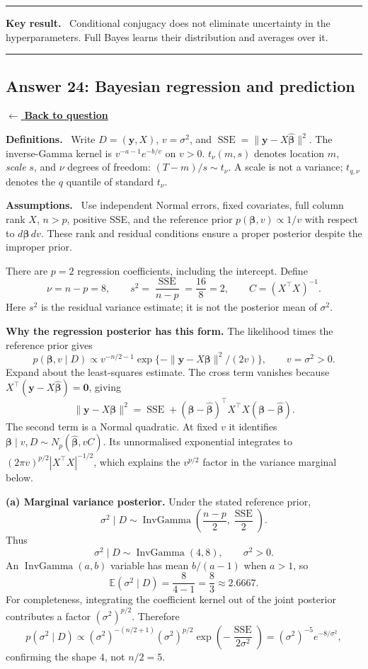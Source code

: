 \documentclass[11pt,a4paper]{article}
\newcommand{\given}{\mathrel{|}}
\DeclareMathOperator{\InvGamma}{InvGamma}
\newcommand{\E}{\mathbb{E}}
\newcommand{\answernav}[1]{%
  \label{answer:#1}%
  \noindent\hyperref[question:#1]{$\leftarrow$ \textbf{Back to question}}%
  \par\smallskip}
\newcommand{\studyheading}[1]{%
  \par\medskip\noindent\textcolor{statblue}{\textbf{#1.}}\ }
\newenvironment{keyresult}
  {\begin{center}\begin{minipage}{0.92\linewidth}\color{statblue}%
   \hrule\vspace{6pt}\textbf{Key result.}\ }
  {\vspace{6pt}\hrule\end{minipage}\end{center}}
\begin{document}
\begin{keyresult}
Conditional conjugacy does not eliminate uncertainty in the hyperparameters.
Full Bayes learns their distribution and averages over it.
\end{keyresult}

\clearpage

\subsection{Answer 24: Bayesian regression and prediction}
\answernav{24}

\studyheading{Definitions}
Write $D=(\mathbf y,X)$, $v=\sigma^2$, and
$\operatorname{SSE}=\|\mathbf y-X\widehat{\boldsymbol\beta}\|^2$.
The inverse-Gamma kernel is $v^{-a-1}e^{-b/v}$ on $v>0$.
$t_\nu(m,s)$ denotes location $m$, \emph{scale} $s$, and $\nu$ degrees of freedom: $(T-m)/s\sim t_\nu$.
A scale is not a variance; $t_{q,\nu}$ denotes the $q$ quantile of standard $t_\nu$.

\studyheading{Assumptions}
Use independent Normal errors, fixed covariates, full column rank $X$, $n>p$, positive SSE, and the reference prior
$p(\boldsymbol\beta,v)\propto1/v$ with respect to $d\boldsymbol\beta\,dv$.
These rank and residual conditions ensure a proper posterior despite the improper prior.

There are $p=2$ regression coefficients, including the intercept. Define
\[
\nu=n-p=8,\qquad
s^2=\frac{\operatorname{SSE}}{n-p}=\frac{16}{8}=2,
\qquad C=(X^\top X)^{-1}.
\]
Here $s^2$ is the residual variance estimate; it is not the posterior mean
of $\sigma^2$.

\textbf{Why the regression posterior has this form.}
The likelihood times the reference prior gives
\[
p(\boldsymbol\beta,v\given D)
\propto v^{-n/2-1}
\exp\{-\|\mathbf y-X\boldsymbol\beta\|^2/(2v)\},
\qquad v=\sigma^2>0.
\]
Expand about the least-squares estimate. The cross term vanishes because
$X^\top(\mathbf y-X\widehat{\boldsymbol\beta})=\mathbf0$, giving
\[
\|\mathbf y-X\boldsymbol\beta\|^2
=\operatorname{SSE}
+(\boldsymbol\beta-\widehat{\boldsymbol\beta})^\top
X^\top X(\boldsymbol\beta-\widehat{\boldsymbol\beta}).
\]
The second term is a Normal quadratic. At fixed $v$ it identifies
$\boldsymbol\beta\given v,D\sim
N_p(\widehat{\boldsymbol\beta},vC)$.
Its unnormalised exponential integrates to
$(2\pi v)^{p/2}|X^\top X|^{-1/2}$, which explains the $v^{p/2}$
factor in the variance marginal below.

\textbf{(a) Marginal variance posterior.}
Under the stated reference prior,
\[
\sigma^2\mid D\sim\InvGamma\left(\frac{n-p}{2},
\frac{\operatorname{SSE}}2\right).
\]
Thus
\[
\boxed{\sigma^2\mid D\sim\InvGamma(4,8),\qquad\sigma^2>0.}
\]
An $\InvGamma(a,b)$ variable has mean $b/(a-1)$ when $a>1$, so
\[
\boxed{\E(\sigma^2\mid D)=\frac8{4-1}=\frac83\approx2.6667.}
\]
For completeness, integrating the coefficient kernel out of the joint
posterior contributes a factor $(\sigma^2)^{p/2}$. Therefore
\[
p(\sigma^2\mid D)
\propto (\sigma^2)^{-(n/2+1)}(\sigma^2)^{p/2}
\exp\!\left(-\frac{\operatorname{SSE}}{2\sigma^2}\right)
=(\sigma^2)^{-5}e^{-8/\sigma^2},
\]
confirming the shape $4$, not $n/2=5$.
\end{document}
